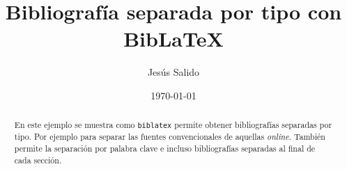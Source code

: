 \documentclass[11pt,a4paper]{article}
\author{Jesús Salido}
\title{Bibliografía separada por tipo con Bib\LaTeX{}}
\date{\today}
\begin{document}
\begin{abstract}
	En este ejemplo se muestra como \texttt{biblatex} permite obtener bibliografías separadas por tipo. Por ejemplo para separar las fuentes convencionales de aquellas \emph{online}. También permite la separación por palabra clave e incluso bibliografías separadas al final de cada sección.
\end{abstract}



\nocite{*} %

\printbibliography[nottype=online,title={Bibliografía}]

\printbibliography[type=online,title={Fuentes online}]
\end{document}
